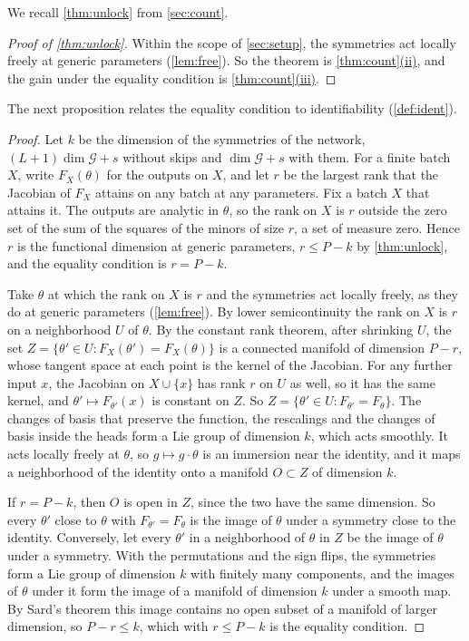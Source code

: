 \documentclass[10pt]{article}
\theoremstyle{definition}
\theoremstyle{remark}
\newcommand{\G}{\mathcal{G}}
\DeclareRobustCommand{\cpref}[2]{\hyperref[#1:#2]{\cref*{#1}(#2)}}
\begin{document}
We recall \cref{thm:unlock} from \cref{sec:count}.
\thmUnlock*

\begin{proof}[Proof of \cref{thm:unlock}]
Within the scope of \cref{sec:setup}, the symmetries act locally freely at generic parameters (\cref{lem:free}). So the theorem is \cpref{thm:count}{ii}, and the gain under the equality condition is \cpref{thm:count}{iii}.
\end{proof}

The next proposition relates the equality condition to identifiability (\cref{def:ident}).

\propLocalId*

\begin{proof}
Let $k$ be the dimension of the symmetries of the network, $(L+1)\dim\G + s$ without skips and $\dim\G + s$ with them. For a finite batch $X$, write $F_X(\theta)$ for the outputs on $X$, and let $r$ be the largest rank that the Jacobian of $F_X$ attains on any batch at any parameters. Fix a batch $X$ that attains it. The outputs are analytic in $\theta$, so the rank on $X$ is $r$ outside the zero set of the sum of the squares of the minors of size $r$, a set of measure zero. Hence $r$ is the functional dimension at generic parameters, $r \le P - k$ by \cref{thm:unlock}, and the equality condition is $r = P - k$.

Take $\theta$ at which the rank on $X$ is $r$ and the symmetries act locally freely, as they do at generic parameters (\cref{lem:free}). By lower semicontinuity the rank on $X$ is $r$ on a neighborhood $U$ of $\theta$. By the constant rank theorem, after shrinking $U$, the set $Z = \{\theta' \in U : F_X(\theta') = F_X(\theta)\}$ is a connected manifold of dimension $P - r$, whose tangent space at each point is the kernel of the Jacobian. For any further input $x$, the Jacobian on $X \cup \{x\}$ has rank $r$ on $U$ as well, so it has the same kernel, and $\theta' \mapsto F_{\theta'}(x)$ is constant on $Z$. So $Z = \{\theta' \in U : F_{\theta'} = F_\theta\}$. The changes of basis that preserve the function, the rescalings and the changes of basis inside the heads form a Lie group of dimension $k$, which acts smoothly. It acts locally freely at $\theta$, so $g \mapsto g\cdot\theta$ is an immersion near the identity, and it maps a neighborhood of the identity onto a manifold $O \subset Z$ of dimension $k$.

If $r = P - k$, then $O$ is open in $Z$, since the two have the same dimension. So every $\theta'$ close to $\theta$ with $F_{\theta'} = F_\theta$ is the image of $\theta$ under a symmetry close to the identity. Conversely, let every $\theta'$ in a neighborhood of $\theta$ in $Z$ be the image of $\theta$ under a symmetry. With the permutations and the sign flips, the symmetries form a Lie group of dimension $k$ with finitely many components, and the images of $\theta$ under it form the image of a manifold of dimension $k$ under a smooth map. By Sard's theorem this image contains no open subset of a manifold of larger dimension, so $P - r \le k$, which with $r \le P - k$ is the equality condition.
\end{proof}
\end{document}
